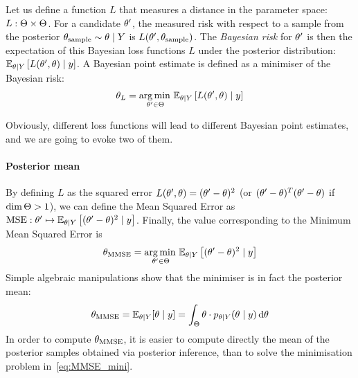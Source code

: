 \documentclass[../../Main_ManuscritThese.tex]{subfiles}
\begin{document}
Let us define a function $L$ that measures a distance in the parameter
space: $L:\Theta\times \Theta$. For a candidate $\theta^{\prime}$, the
measured risk with respect to a sample from the posterior
$\theta_{\mathrm{sample}} \sim \theta \mid Y$ is
$L(\theta^{\prime}, \theta_{\mathrm{sample}})$.  The \emph{Bayesian
  risk} for $\theta^{\prime}$ is then the expectation of this Bayesian
loss functions $L$ under the posterior distribution:
$\mathbb{E}_{\theta\mid Y}\left[L(\theta^{\prime},\theta)\mid y\right]$. A
Bayesian point estimate is defined as a minimiser of the Bayesian
risk:
\begin{equation}
  \theta_{L} = \operatorname*{arg\,min \,}_{\theta^{\prime} \in \Theta} \mathbb{E}_{\theta\mid Y}\left[L(\theta^{\prime}, \theta) \mid y\right]
\end{equation}

Obviously, different loss functions will lead to different Bayesian
point estimates, and we are going to evoke two of them.
\paragraph{Posterior mean}
By defining $L$ as the squared error
$L(\theta^{\prime}, \theta) = (\theta^{\prime} - \theta)^2$ (or $(\theta^{\prime} - \theta)^T(\theta^{\prime} - \theta)$ if $\dim \Theta > 1$), we can
define the Mean Squared Error as
$\mathrm{MSE}: \theta^{\prime}\mapsto\mathbb{E}_{\theta\mid
  Y}\left[(\theta^{\prime} - \theta)^2 \mid y\right]$. Finally, the
value corresponding to the Minimum Mean Squared Error is
\begin{equation}
  \label{eq:MMSE_mini}
  {\theta}_{\mathrm{MMSE}} = \operatorname*{arg\,min \,}_{\theta^{\prime}\in\Theta}\mathbb{E}_{\theta\mid Y}\left[(\theta^{\prime} - \theta)^2 \mid  y\right]
\end{equation}
Simple algebraic manipulations show that the minimiser is in fact the posterior mean:
\begin{equation}
  \label{eq:def_MMSE}
  {\theta}_{\mathrm{MMSE}} = \mathbb{E}_{\theta\mid Y}[\theta \mid  y] = \int_{\Theta}\theta\cdot p_{\theta\mid Y}(\theta \mid  y)\,\mathrm{d}\theta
\end{equation}
In order to compute ${\theta}_{\mathrm{MMSE}}$, it is easier to compute
directly the mean of the posterior samples obtained via posterior
inference, than to solve the minimisation problem
in~\cref{eq:MMSE_mini}.
\end{document}
